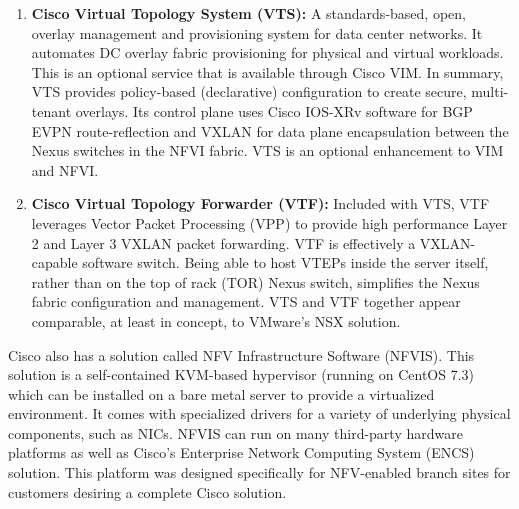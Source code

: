 \begin{enumerate}
  \item \textbf{Cisco Virtual Topology System (VTS):} A standards-based, open,
  overlay management and provisioning system for data center networks. It automates DC
  overlay fabric provisioning for physical and virtual workloads. This is an
  optional service that is available through Cisco VIM. In summary, VTS provides
  policy-based (declarative) configuration to create secure, multi-tenant
  overlays. Its control plane uses Cisco IOS-XRv software for BGP EVPN
  route-reflection and VXLAN for data plane encapsulation between the Nexus
  switches in the NFVI fabric. VTS is an optional enhancement to VIM and NFVI.
  \item \textbf{Cisco Virtual Topology Forwarder (VTF):} Included with VTS, VTF
  leverages Vector Packet Processing (VPP) to provide high performance Layer 2
  and Layer 3 VXLAN packet forwarding. VTF is effectively a VXLAN-capable
  software switch. Being able to host VTEPs inside the server itself, rather
  than on the top of rack (TOR) Nexus switch, simplifies the Nexus fabric
  configuration and management. VTS and VTF together appear comparable, at least
  in concept, to VMware's NSX solution.
\end{enumerate}

Cisco also has a solution called NFV Infrastructure Software (NFVIS). This
solution is a self-contained KVM-based hypervisor (running on CentOS 7.3)
which can be installed on a bare metal server to provide a virtualized
environment. It comes with specialized drivers for a variety of underlying
physical components, such as NICs. NFVIS can run on many third-party hardware
platforms as well as Cisco's Enterprise Network Computing System (ENCS)
solution. This platform was designed specifically for NFV-enabled branch sites
for customers desiring a complete Cisco solution.


